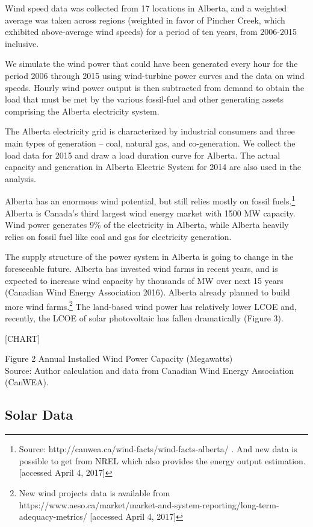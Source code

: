 Wind speed data was collected from 17 locations in Alberta, and a
weighted average was taken across regions (weighted in favor of Pincher
Creek, which exhibited above-average wind speeds) for a period of ten
years, from 2006-2015 inclusive.

We simulate the wind power that could have been generated every hour for
the period 2006 through 2015 using wind-turbine power curves and the
data on wind speeds. Hourly wind power output is then subtracted from
demand to obtain the load that must be met by the various fossil-fuel
and other generating assets comprising the Alberta electricity system.

The Alberta electricity grid is characterized by industrial consumers
and three main types of generation -- coal, natural gas, and
co-generation. We collect the load data for 2015 and draw a load
duration curve for Alberta. The actual capacity and generation in
Alberta Electric System for 2014 are also used in the analysis.

Alberta has an enormous wind potential, but still relies mostly on
fossil fuels.\footnote{Source:
  http://canwea.ca/wind-facts/wind-facts-alberta/ . And new data is
  possible to get from NREL which also provides the energy output
  estimation. {[}accessed April 4, 2017{]}} Alberta is Canada's third
largest wind energy market with 1500 MW capacity. Wind power generates
9\% of the electricity in Alberta, while Alberta heavily relies on
fossil fuel like coal and gas for electricity generation.

The supply structure of the power system in Alberta is going to change
in the foreseeable future. Alberta has invested wind farms in recent
years, and is expected to increase wind capacity by thousands of MW over
next 15 years (Canadian Wind Energy Association 2016). Alberta already
planned to build more wind farms.\footnote{New wind projects data is
  available from
  https://www.aeso.ca/market/market-and-system-reporting/long-term-adequacy-metrics/
  {[}accessed April 4, 2017{]}} The land-based wind power has relatively
lower LCOE and, recently, the LCOE of solar photovoltaic has fallen
dramatically (Figure 3).

{{[}CHART{]}}

Figure 2 Annual Installed Wind Power Capacity (Megawatts)\\
Source: Author calculation and data from Canadian Wind Energy
Association (CanWEA).

\subsection{Solar Data}\label{solar-data}

